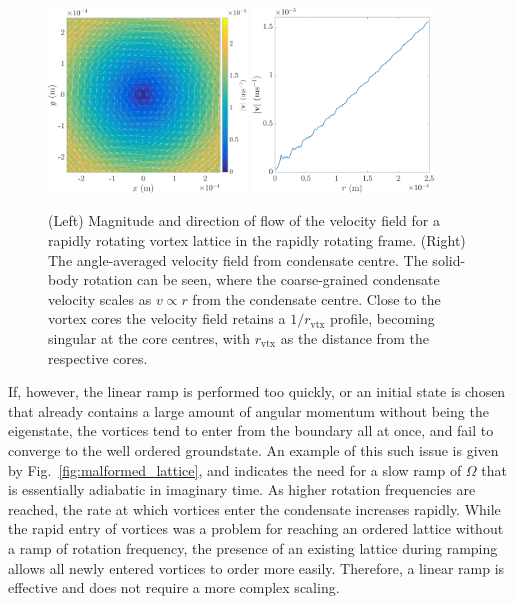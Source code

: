 \begin{figure}\centering
    \includegraphics[width=0.47\textwidth,clip,trim={0cm 0cm 0 0cm}]{Images/ch4_vtx/solidbody_v}
    \includegraphics[width=0.43\textwidth,clip,trim={0cm 0cm 0 0cm}]{Images/ch4_vtx/solidbody_vel_r}
    \caption{(Left) Magnitude and direction of flow of the velocity field for a rapidly rotating vortex lattice in the rapidly rotating frame. (Right) The angle-averaged velocity field from condensate centre. The solid-body rotation can be seen, where the coarse-grained condensate velocity scales as $v \propto r$ from the condensate centre. Close to the vortex cores the velocity field retains a $1/r_{\textrm{vtx}}$ profile, becoming singular at the core centres, with $r_{\textrm{vtx}}$ as the distance from the respective cores.}
    \label{fig:solidbody}
\end{figure}

If, however, the linear ramp is performed too quickly, or an initial state is chosen that already contains a large amount of angular momentum without being the eigenstate, the vortices tend to enter from the boundary all at once, and fail to converge to the well ordered groundstate. An example of this such issue is given by Fig.~\ref{fig:malformed_lattice}, and indicates the need for a slow ramp of $\Omega$ that is essentially adiabatic in imaginary time. As higher rotation frequencies are reached, the rate at which vortices enter the condensate increases rapidly. While the rapid entry of vortices was a problem for reaching an ordered lattice without a ramp of rotation frequency, the presence of an existing lattice during ramping allows all newly entered vortices to order more easily. Therefore, a linear ramp is effective and does not require a more complex scaling.


